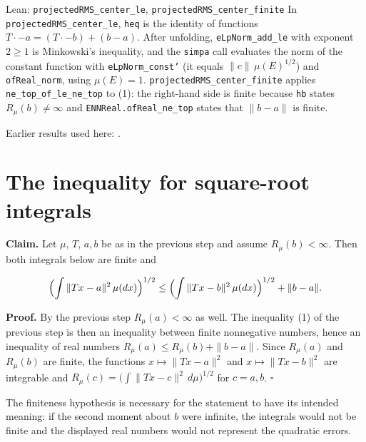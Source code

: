 \documentclass[11pt,a4paper]{article}
\begin{document}
\begin{leanbox}{Lean: \texttt{projectedRMS\_\allowbreak{}center\_\allowbreak{}le}, \texttt{projectedRMS\_\allowbreak{}center\_\allowbreak{}finite}}
In \texttt{projected\allowbreak{}RMS\_\allowbreak{}center\_\allowbreak{}le}, \texttt{heq} is the identity of functions \(T\cdot-a=(T\cdot-b)+(b-a)\). After unfolding, \texttt{e\allowbreak{}Lp\allowbreak{}Norm\_\allowbreak{}add\_\allowbreak{}le} with exponent \(2\ge1\) is Minkowski's inequality, and the \texttt{simpa} call evaluates the norm of the constant function with \texttt{e\allowbreak{}Lp\allowbreak{}Norm\_\allowbreak{}const'} (it equals \(\|c\|\,\mu(E)^{1/2}\)) and \texttt{of\allowbreak{}Real\_\allowbreak{}norm}, using \(\mu(E)=1\). \texttt{projected\allowbreak{}RMS\_\allowbreak{}center\_\allowbreak{}finite} applies \texttt{ne\_\allowbreak{}top\_\allowbreak{}of\_\allowbreak{}le\_\allowbreak{}ne\_\allowbreak{}top} to (1): the right-hand side is finite because \texttt{hb} states \(R_\mu(b)\ne\infty\) and \texttt{ENNReal.\allowbreak{}of\allowbreak{}Real\_\allowbreak{}ne\_\allowbreak{}top} states that \(\|b-a\|\) is finite.
\end{leanbox}


Earlier results used here: \cite[Section~3.48.1]{LangevinLean2026ULASC}.

\section{\texorpdfstring{The inequality for square-root integrals}{The inequality for square-root integrals}}


\textbf{Claim.} Let \(\mu\), \(T\), \(a,b\) be as in the previous step and assume \(R_\mu(b)<\infty\). Then both integrals below are finite and


\[\Bigl(\int\|Tx-a\|^2\,\mu(dx)\Bigr)^{1/2}\le\Bigl(\int\|Tx-b\|^2\,\mu(dx)\Bigr)^{1/2}+\|b-a\| .\]


\textbf{Proof.} By the previous step \(R_\mu(a)<\infty\) as well. The inequality (1) of the previous step is then an inequality between finite nonnegative numbers, hence an inequality of real numbers \(R_\mu(a)\le R_\mu(b)+\|b-a\|\). Since \(R_\mu(a)\) and \(R_\mu(b)\) are finite, the functions \(x\mapsto\|Tx-a\|^2\) and \(x\mapsto\|Tx-b\|^2\) are integrable and \(R_\mu(c)=\bigl(\int\|Tx-c\|^2\,d\mu\bigr)^{1/2}\) for \(c=a,b\). \(\square\)




The finiteness hypothesis is necessary for the statement to have its intended meaning: if the second moment about \(b\) were infinite, the integrals would not be finite and the displayed real numbers would not represent the quadratic errors.
\end{document}
